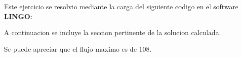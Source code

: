 \begin{homeworkProblem}

Este ejercicio se resolvio mediante la carga del siguiente codigo en el software \textbf{LINGO}:


A continuacion se incluye la seccion pertinente de la solucion calculada.


Se puede apreciar que el flujo maximo es de 108.
\end{homeworkProblem}